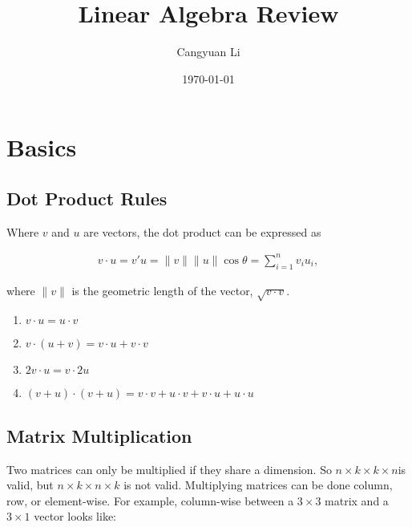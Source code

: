 \documentclass[14pt]{extreport}
\title{Linear Algebra Review}
\author{Cangyuan Li}
\date{\today}
\newcommand{\sumn}[0]{\sum\limits_{i=1}^n}
\begin{document}
    
\maketitle

\section{Basics}

\subsection{Dot Product Rules}

Where \( v \) and \( u \) are vectors, the dot product can be expressed as 

\begin{align*}
    v \cdot u = v'u = \lVert v \rVert \lVert u \rVert \cos \theta = \sumn v_i u_i,
\end{align*}

where \( \lVert v \rVert \) is the geometric length of the vector, \( \sqrt{v \cdot v} \).

\begin{enumerate}
    \item \( v \cdot u = u \cdot v \)
    \item \( v \cdot (u + v) = v \cdot u + v \cdot v \)
    \item \( 2v \cdot u = v \cdot 2u \)
    \item \( (v + u) \cdot (v + u) = v \cdot v + u \cdot v + v \cdot u + u \cdot u \)
\end{enumerate}

\subsection{Matrix Multiplication}

Two matrices can only be multiplied if they share a dimension. So \( n \times k \times k \times n \)is valid, but \( n \times k \times n \times k \) is not valid. Multiplying matrices can be done column, row, or element-wise. For example, column-wise between a \( 3 \times 3 \) matrix and a \( 3 \times 1 \) vector looks like:
\end{document}
